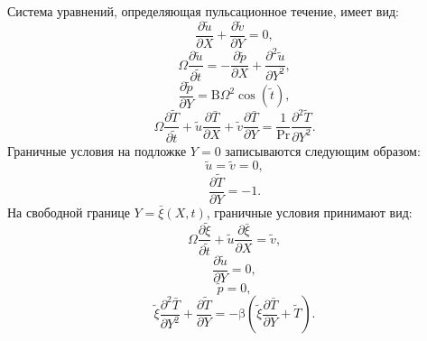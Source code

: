 \documentclass[12pt,a4paper]{article}
\begin{document}
	Система уравнений, определяющая пульсационное течение, имеет вид:
\begin{equation}
	\frac{\partial \tilde{u}}{\partial X} + \frac{\partial \tilde{v}}{\partial Y} = 0,
\end{equation}
\begin{equation}
	\Omega \frac{\partial \tilde{u}}{\partial \tilde{t}} = -\frac{\partial \tilde{p}}{\partial X} + \frac{\partial^2 \tilde{u}}{\partial Y^2},
\end{equation}
\begin{equation}
	\frac{\partial \tilde{p}}{\partial Y} =\mathrm{B} \Omega^2 \cos(\tilde{t}),
\end{equation}
\begin{equation}
	\Omega \frac{\partial \tilde{T}}{\partial \tilde{t}} + \tilde{u} \frac{\partial \bar{T}}{\partial X} + \tilde{v} \frac{\partial \bar{T}}{\partial Y} = \frac{1}{\mathrm{Pr}} \frac{\partial^2 \tilde{T}}{\partial Y^2}.
\end{equation}
Граничные условия на подложке \( Y = 0 \) записываются следующим образом:
\begin{equation}
	\tilde{u} =	\tilde{v} = 0,
\end{equation}
\begin{equation}
	\frac{\partial \tilde{T}}{\partial Y} = -1.
\end{equation}
На свободной границе \( Y = \bar{\xi}(X, t) \), граничные условия принимают вид:
\begin{equation}
	\Omega \frac{\partial \tilde{\xi}}{\partial \tilde{t}} + \tilde{u} \frac{\partial \bar{\xi}}{\partial X} = \tilde{v},
\end{equation}
\begin{equation}
	\frac{\partial \tilde{u}}{\partial Y} = 0,
\end{equation}
\begin{equation}
	\tilde{p} = 0,
\end{equation}
\begin{equation}
	\tilde{\xi} \frac{\partial^2 \bar{T}}{\partial Y^2} + \frac{\partial \tilde{T}}{\partial Y} = -\mathrm{\beta} \left( \tilde{\xi} \frac{\partial \bar{T}}{\partial Y} + \tilde{T} \right).
\end{equation}

\end{document}
